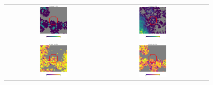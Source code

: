 \documentclass[preprintm,linenumbers]{aastex631}
\begin{document}
\begin{figure}
\begin{tabular}{  c c c}
				\includegraphics[width=0.3\textwidth]{results/skymaps_cutout/skymaps_cutout_first_year_one_snap_v4_0_10yrs_db_noDD_noTwi_tscale-28_nside-256_doAllTemplateMetrics_reduceCount_g_WFD_noDD_noTwi.pdf} &
				\includegraphics[width=0.3\textwidth]{results/skymaps_cutout/skymaps_cutout_first_year_one_snap_v4_0_10yrs_db_noDD_noTwi_tscale-28_nside-256_doAllTemplateMetrics_reduceCount_g_GP_noDD_noTwi.pdf} \\
				\includegraphics[width=0.3\textwidth]{results/skymaps_cutout/skymaps_cutout_delta_first_year_one_snap_v4_0_10yrs_db_noDD_noTwi_tscale-28_nside-256_doAllTemplateMetrics_reduceCount_g_NES_noDD_noTwi.pdf} &
				\includegraphics[width=0.3\textwidth]{results/skymaps_cutout/skymaps_cutout_delta_first_year_one_snap_v4_0_10yrs_db_noDD_noTwi_tscale-28_nside-256_doAllTemplateMetrics_reduceCount_g_WFD_noDD_noTwi.pdf} &

\end{tabular}
\end{figure}
\end{document}
